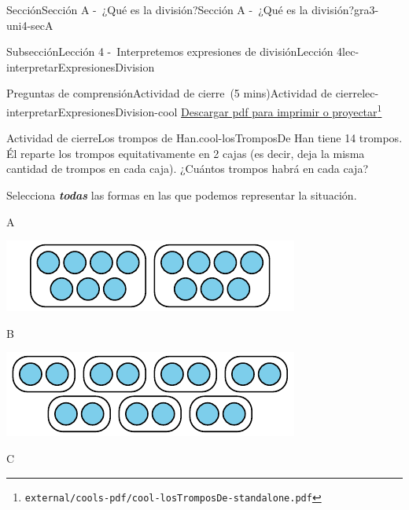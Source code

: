 \documentclass[oneside,10pt,]{article}
\newcommand{\alert}[1]{\textbf{\textit{#1}}}
\begin{document}
\begin{sectionptx}{Sección}{Sección A -~¿Qué es la división?}{}{Sección A -~¿Qué es la división?}{}{}{gra3-uni4-secA}
\begin{subsectionptx}{Subsección}{Lección 4 -~Interpretemos expresiones de división}{}{Lección 4}{}{}{lec-interpretarExpresionesDivision}
%
\begin{reading-questions-subsubsection}{Preguntas de comprensión}{Actividad de cierre~(5 mins)}{}{Actividad de cierre}{}{}{lec-interpretarExpresionesDivision-cool}
\href{external/cools-pdf/cool-losTromposDe-standalone.pdf}{Descargar pdf para imprimir o proyectar}\footnote{\nolinkurl{external/cools-pdf/cool-losTromposDe-standalone.pdf}\label{lec-interpretarExpresionesDivision-cool-5}}\begin{project}{Actividad de cierre}{Los trompos de Han.}{cool-losTromposDe}%
Han tiene 14 trompos. Él reparte los trompos equitativamente en 2 cajas (es decir, deja la misma cantidad de trompos en cada caja). ¿Cuántos trompos habrá en cada caja?%
\par
Selecciona \alert{todas} las formas en las que podemos representar la situación.%
\begin{sidebyside}{4}{0.0075}{0.0075}{0.015}%
\begin{sbspanel}{0.04}%
A%
\end{sbspanel}%
\begin{sbspanel}{0.43}%
\includegraphics[width=\linewidth]{external/svg-source/tikz-file-151100.pdf}
\end{sbspanel}%
\begin{sbspanel}{0.04}%
B%
\end{sbspanel}%
\begin{sbspanel}{0.43}%
\includegraphics[width=\linewidth]{external/svg-source/tikz-file-151101.pdf}
\end{sbspanel}%
\end{sidebyside}%
\begin{sidebyside}{4}{0.0075}{0.0075}{0.015}%
\begin{sbspanel}{0.04}%
C%
\end{sbspanel}%

\end{sidebyside}
\end{project}
\end{reading-questions-subsubsection}
\end{subsectionptx}
\end{sectionptx}
\end{document}
